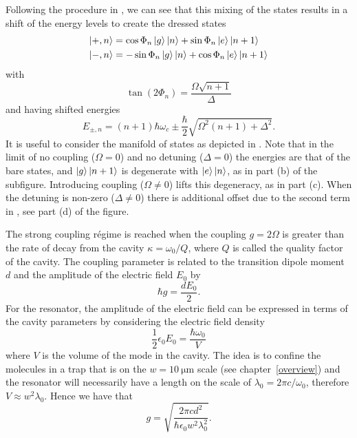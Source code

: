 Following the procedure in , we can see that this
mixing of the states results in a shift of the energy levels to create the
dressed states
%
\begin{align}
  \ket{+, n} &= \cos\Phi_n \ket{g}\ket{n} + \sin\Phi_n \ket{e}\ket{n+1} \\
  \ket{-, n} &= -\sin\Phi_n \ket{g}\ket{n} + \cos\Phi_n \ket{e}\ket{n+1}
\end{align}
%
with
%
\begin{equation}
  \tan(2\Phi_n) = \frac{\Omega\sqrt{n+1}}{\Delta}
\end{equation}
%
and having shifted energies
%
\begin{equation}
  E_{\pm, n} = (n+1)\hbar\omega_c \pm \frac{\hbar}{2}\sqrt{\Omega^2(n+1) +
  \Delta^2}.
  \label{theory:eqn:JCHenergies}
\end{equation}
%
It is useful to consider the manifold of states as depicted in
.  
Note that in the limit of no coupling
($\Omega = 0$) and no detuning ($\Delta = 0$) the energies are that of the bare
states, and $\ket{g}\ket{n+1}$ is degenerate with $\ket{e}\ket{n}$, as in part
(b) of the subfigure. Introducing coupling ($\Omega \neq 0$) lifts this
degeneracy, as in part (c). When the detuning is non-zero ($\Delta \neq 0$)
there is additional offset due to the second term in
, see part (d) of the figure.

The strong coupling r\'egime is reached when the coupling $g=2\Omega$ is
greater than the rate of decay from the cavity $\kappa = \omega_0 / Q$, where
$Q$ is called the quality factor of the cavity. The coupling parameter is
related to the transition dipole moment $d$ and the amplitude of the electric
field $E_0$ by
%
\begin{equation}
  \hbar g = \frac{d E_0}{2}.
\end{equation}
%
For the resonator, the amplitude of the electric field can be expressed in
terms of the cavity parameters by considering the electric field density
%
\begin{equation}
  \frac{1}{2} \epsilon_0 E_0 = \frac{\hbar \omega_0}{V}
\end{equation}
%
where $V$ is the volume of the mode in the cavity. The idea is to confine the
molecules in a trap that is on the $w=\SI{10}{\micro\meter}$ scale (see
chapter~\ref{overview}) and the resonator will necessarily have a length on the
scale of $\lambda_0 = 2\pi c / \omega_0$, therefore $V\approx w^2\lambda_0$.
Hence we have that
%
\begin{equation}
  g = \sqrt{\frac{2\pi c d^2}{\hbar \epsilon_0 w^2 \lambda_0^2}}.
\end{equation}

